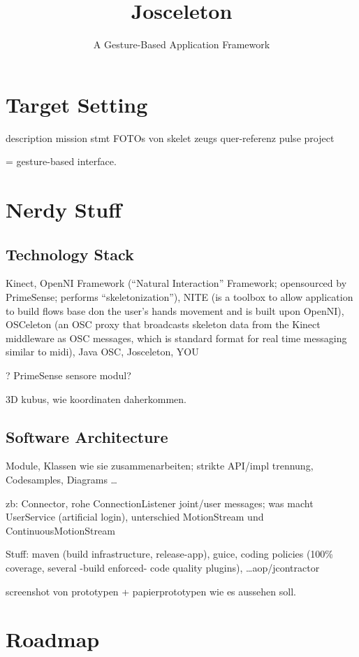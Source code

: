 \documentclass[a4paper,12pt]{article}
\title{Josceleton}
\author{A Gesture-Based Application Framework}
\begin{document}
\maketitle

\section{Target Setting}
description
mission stmt
FOTOs von skelet zeugs
quer-referenz pulse project

= gesture-based interface.


\section{Nerdy Stuff}

\subsection{Technology Stack}

Kinect, OpenNI Framework (``Natural Interaction'' Framework; opensourced by PrimeSense; performs ``skeletonization''), NITE (is a toolbox to allow application to build flows base don the user's hands movement and is built upon OpenNI), OSCeleton (an OSC proxy that broadcasts skeleton data from the Kinect middleware as OSC messages, which is standard format for real time messaging similar to midi), Java OSC, Josceleton, YOU

? PrimeSense sensore modul?

3D kubus, wie koordinaten daherkommen.

\subsection{Software Architecture}

Module, Klassen wie sie zusammenarbeiten; strikte API/impl trennung, Codesamples, Diagrams \ldots

zb: Connector, rohe ConnectionListener joint/user messages; was macht UserService (artificial login), unterschied MotionStream und ContinuousMotionStream

Stuff: maven (build infrastructure, release-app), guice, coding policies (100\% coverage, several -build enforced- code quality plugins), \ldots aop/jcontractor

screenshot von prototypen + papierprototypen wie es aussehen soll.


\section{Roadmap}
\end{document}
